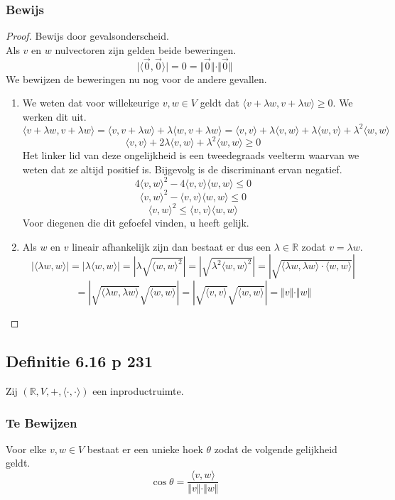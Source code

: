 \documentclass[lineaire_algebra_oplossingen.tex]{subfiles}
\begin{document}
\subsubsection*{Bewijs}
\begin{proof}
Bewijs door gevalsonderscheid.\\
Als $v$ en $w$ nulvectoren zijn gelden beide beweringen.
\[
\vert\langle \vec{0},\vec{0}\rangle\vert =0= \Vert \vec{0}\Vert\cdot \Vert \vec{0}\Vert
\]
We bewijzen de beweringen nu nog voor de andere gevallen.

\begin{enumerate}
\item
We weten dat voor willekeurige $v,w\in V$ geldt dat $\langle v + \lambda w,v+\lambda w\rangle \ge 0$. We werken dit uit.
\[
\langle v + \lambda w,v+\lambda w\rangle = \langle v,v+\lambda w \rangle + \lambda \langle w,v+\lambda w\rangle = \langle v,v \rangle + \lambda \langle v,w \rangle + \lambda \langle w,v\rangle + \lambda^2\langle w,w\rangle
\]
\[
\langle v,v \rangle + 2\lambda \langle v,w \rangle + \lambda^2\langle w,w\rangle \ge 0
\]
Het linker lid van deze ongelijkheid is een tweedegraads veelterm waarvan we weten dat ze altijd positief is. Bijgevolg is de discriminant ervan negatief.
\[
4\langle v,w\rangle^2-4\langle v,v\rangle\langle w,w\rangle \le 0
\]
\[
\langle v,w\rangle^2-\langle v,v\rangle\langle w,w\rangle \le 0
\]
\[
\langle v,w\rangle^2 \le \langle v,v\rangle\langle w,w\rangle 
\]
Voor diegenen die dit gefoefel vinden, u heeft gelijk.

\item
Als $w$ en $v$ lineair afhankelijk zijn dan bestaat er dus een $\lambda\in\mathbb{R}$ zodat $v=\lambda w$.
\[
|\langle \lambda w, w \rangle| = |\lambda  \langle w, w \rangle| = |\lambda\sqrt{\langle w, w \rangle^2}| = |\sqrt{\lambda^2\langle w, w \rangle^2}| = |\sqrt{\langle \lambda w, \lambda w \rangle \cdot \langle w, w \rangle }| \]
\[
= |\sqrt{\langle \lambda w, \lambda w \rangle} \sqrt{\langle w, w \rangle }| = |\sqrt{\langle v, v \rangle} \sqrt{\langle w, w \rangle }| = \Vert v\Vert\cdot \Vert w\Vert
\]
\end{enumerate}
\end{proof}


\subsection{Definitie 6.16 p 231}
\label{6.16}
Zij $(\mathbb{R},V,+,\langle\cdot,\cdot\rangle)$ een inproductruimte.

\subsubsection*{Te Bewijzen}
Voor elke $v,w\in V$ bestaat er een unieke hoek $\theta$ zodat de volgende gelijkheid geldt.
\[
\cos\theta = \frac{\langle v,w\rangle}{\Vert v\Vert\cdot \Vert w\Vert}
\]
\end{document}
